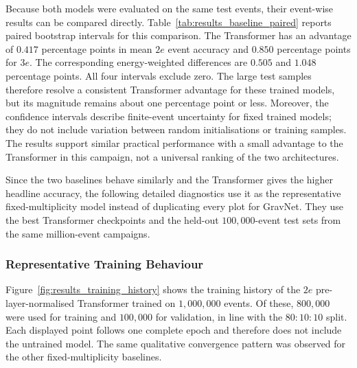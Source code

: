 

Because both models were evaluated on the same test events, their
event-wise results can be compared directly. Table~\ref{tab:results_baseline_paired}
reports paired bootstrap intervals for this comparison. The Transformer has
an advantage of \(0.417\) percentage points in mean \(2e\) event accuracy and
\(0.850\) percentage points for \(3e\). The corresponding energy-weighted
differences are \(0.505\) and \(1.048\) percentage points. All four intervals
exclude zero. The large test samples therefore resolve a consistent
Transformer advantage for these trained models, but its magnitude remains
about one percentage point or less. Moreover, the
confidence intervals describe finite-event uncertainty for fixed trained
models; they do not include variation between random initialisations or
training samples. The results support similar practical performance with a
small advantage to the Transformer in this campaign, not a universal ranking
of the two architectures.



Since the two baselines behave similarly and the Transformer gives the higher
headline accuracy, the following detailed diagnostics use it as the
representative fixed-multiplicity model instead of duplicating every plot for
GravNet. They use the best Transformer checkpoints and the held-out
\(100{,}000\)-event test sets from the same million-event campaigns.

\clearpage
\subsubsection{Representative Training Behaviour}

Figure~\ref{fig:results_training_history} shows the training history of the
\(2e\) pre-layer-normalised Transformer trained on \(1{,}000{,}000\) events.
Of these, \(800{,}000\) were used for training and \(100{,}000\) for
validation, in line with the \(80{:}10{:}10\) split. Each displayed point
follows one complete epoch and therefore does
not include the untrained model. The same qualitative convergence pattern was
observed for the other fixed-multiplicity baselines.

